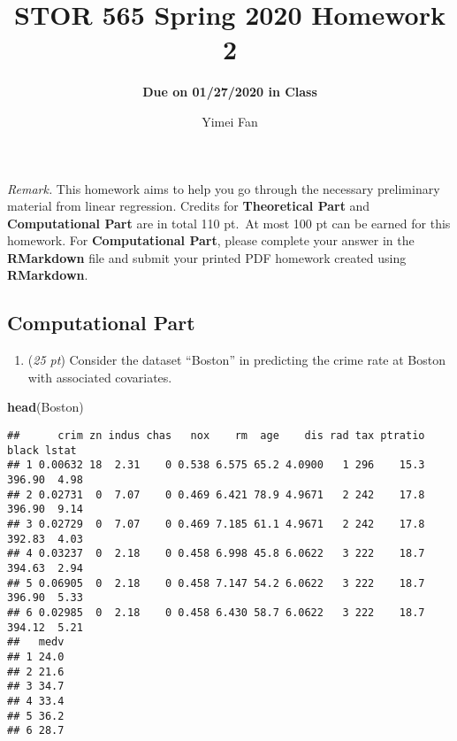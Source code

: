 \documentclass[
]{article}
\title{STOR 565 Spring 2020 Homework 2}
\subtitle{\textbf{Due on 01/27/2020 in Class}}
\author{Yimei Fan}
\date{}
\newenvironment{Shaded}{\begin{snugshade}}{\end{snugshade}}
\newcommand{\KeywordTok}[1]{\textcolor[rgb]{0.13,0.29,0.53}{\textbf{#1}}}
\newcommand{\NormalTok}[1]{#1}
\providecommand{\tightlist}{%
  \setlength{\itemsep}{0pt}\setlength{\parskip}{0pt}}
\begin{document}
\maketitle

\theoremstyle{definition}
\newtheorem*{hint}{Hint}

\theoremstyle{remark}
\newtheorem*{rmk}{Remark}

\emph{Remark.} This homework aims to help you go through the necessary
preliminary material from linear regression. Credits for
\textbf{Theoretical Part} and \textbf{Computational Part} are in total
110 pt.~At most 100 pt can be earned for this homework. For
\textbf{Computational Part}, please complete your answer in the
\textbf{RMarkdown} file and submit your printed PDF homework created
using \textbf{RMarkdown}.

\hypertarget{computational-part}{%
\subsection{Computational Part}\label{computational-part}}

\begin{enumerate}
\def\labelenumi{\arabic{enumi}.}
\tightlist
\item
  (\emph{25 pt}) Consider the dataset ``Boston'' in predicting the crime
  rate at Boston with associated covariates.
\end{enumerate}

\begin{Shaded}
\begin{Highlighting}[]
\KeywordTok{head}\NormalTok{(Boston)}
\end{Highlighting}
\end{Shaded}

\begin{verbatim}
##      crim zn indus chas   nox    rm  age    dis rad tax ptratio  black lstat
## 1 0.00632 18  2.31    0 0.538 6.575 65.2 4.0900   1 296    15.3 396.90  4.98
## 2 0.02731  0  7.07    0 0.469 6.421 78.9 4.9671   2 242    17.8 396.90  9.14
## 3 0.02729  0  7.07    0 0.469 7.185 61.1 4.9671   2 242    17.8 392.83  4.03
## 4 0.03237  0  2.18    0 0.458 6.998 45.8 6.0622   3 222    18.7 394.63  2.94
## 5 0.06905  0  2.18    0 0.458 7.147 54.2 6.0622   3 222    18.7 396.90  5.33
## 6 0.02985  0  2.18    0 0.458 6.430 58.7 6.0622   3 222    18.7 394.12  5.21
##   medv
## 1 24.0
## 2 21.6
## 3 34.7
## 4 33.4
## 5 36.2
## 6 28.7
\end{verbatim}
\end{document}
